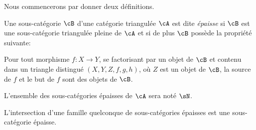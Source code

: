 Nous commencerons par donner deux d\'efinitions. 





\begin{definition}\label{VIII:2-1-1}
Une sous-cat\'egorie $\cB$ d'une cat\'egorie triangul\'ee $\cA$ est dite 
\emph{\'epaisse} si $\cB$ est une sous-cat\'egorie triangul\'ee pleine de $\cA$ 
et si de plus $\cB$ poss\`ede la propri\'et\'e suivante: 

Pour tout morphisme $f:X\to Y$, se factorisant par un objet de $\cB$ et contenu 
dans un triangle distingu\'e $(X,Y,Z,f,g,h)$, o\`u $Z$ est un objet de $\cB$, 
la source de $f$ et le but de $f$ sont des objets de $\cB$. 
\end{definition}

L'ensemble des sous-cat\'egories \'epaisses de $\cA$ sera not\'e $\sN$. 

L'intersection d'une famille quelconque de sous-cat\'egories \'epaisses est 
une sous-cat\'egorie \'epaisse. 





